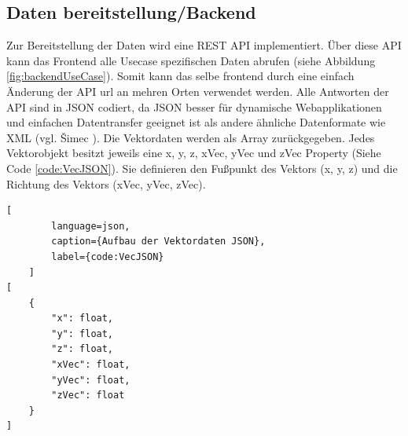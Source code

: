 \subsection{Daten bereitstellung/Backend}
\label{section:Backend}

Zur Bereitstellung der Daten wird eine REST API implementiert.
Über diese API kann das Frontend alle Usecase spezifischen Daten
abrufen (siehe Abbildung \ref{fig:backendUseCase}). Somit kann das
selbe frontend durch eine einfach Änderung der API url an mehren
Orten verwendet werden. Alle Antworten der API sind in JSON codiert,
da JSON besser für dynamische Webapplikationen und einfachen
Datentransfer geeignet ist als andere ähnliche Datenformate wie
XML (vgl. Šimec \cite{comparisonJsonXml}). Die Vektordaten werden
als Array zurückgegeben. Jedes Vektorobjekt besitzt jeweils eine
x, y, z, xVec, yVec und zVec Property (Siehe Code \ref{code:VecJSON}).
Sie definieren den Fußpunkt des Vektors (x, y, z) und die Richtung
des Vektors (xVec, yVec, zVec).

\begin{codeblock}
	\begin{lstlisting}[
		language=json,
		caption={Aufbau der Vektordaten JSON},
		label={code:VecJSON}
	]
[
	{
		"x": float,
		"y": float,
		"z": float,
		"xVec": float,
		"yVec": float,
		"zVec": float
	}
]
	\end{lstlisting}
\end{codeblock}

